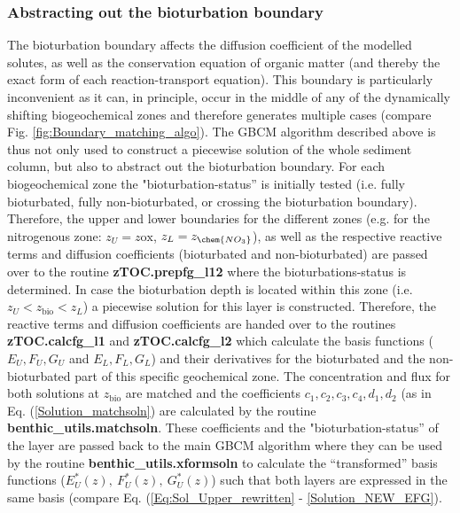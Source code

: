\documentclass[gmd, manuscript]{copernicus}
\begin{document}
\subsubsection{Abstracting out the bioturbation boundary}
The bioturbation boundary affects the diffusion coefficient of the modelled solutes, as well as the conservation equation of organic matter (and thereby the exact form of each reaction-transport equation). 
This boundary is particularly inconvenient as it can, in principle, occur in the middle of any of the dynamically shifting biogeochemical zones and therefore generates multiple cases (compare Fig. \ref{fig:Boundary_matching_algo}). 
The GBCM algorithm described above is thus not only used to construct a piecewise solution of the whole sediment column, but also to abstract out the bioturbation boundary. 
For each biogeochemical zone the "bioturbation-status'' is initially tested (i.e. fully bioturbated, fully non-bioturbated, or crossing the bioturbation boundary). 
Therefore, the upper and lower boundaries for the different zones (e.g. for the nitrogenous zone: $z_U = z\mathrm{ox}$, $z_L = z_\chem{NO_3}$), as well as the respective reactive terms and diffusion coefficients 
(bioturbated and non-bioturbated) are passed over to the routine \textsf{\textbf{zTOC.prepfg\_l12}} where the bioturbations-status is determined. In case the bioturbation depth is located within this zone 
(i.e. $z_U < z_\mathrm{bio} < z_L$) a piecewise solution for this layer is constructed. Therefore, the reactive terms and diffusion coefficients are handed over to the routines \textsf{\textbf{zTOC.calcfg\_l1}} and 
\textsf{\textbf{zTOC.calcfg\_l2}} which calculate the basis functions ($E_U, F_U, G_U$ and  $E_L, F_L, G_L$) and their derivatives for the bioturbated and the non-bioturbated part of this specific geochemical zone. 
The concentration and flux for both solutions at $z_\mathrm{bio}$ are matched and the coefficients $c_1, c_2, c_3, c_4, d_1, d_2$ (as in Eq. (\ref{Solution_matchsoln}) are calculated by the routine 
\textsf{\textbf{benthic\_utils.matchsoln}}. These coefficients and the "bioturbation-status'' of the layer are passed back to the main GBCM algorithm where they can be used by the routine \textsf{\textbf{benthic\_utils.xformsoln}} 
to calculate the ``transformed'' basis functions ($E_U^*(z),\ F_U^*(z),\ G_U^*(z)$) such that both layers are expressed in the same basis (compare Eq. (\ref{Eq:Sol_Upper_rewritten} - \ref{Solution_NEW_EFG}). 
\end{document}
